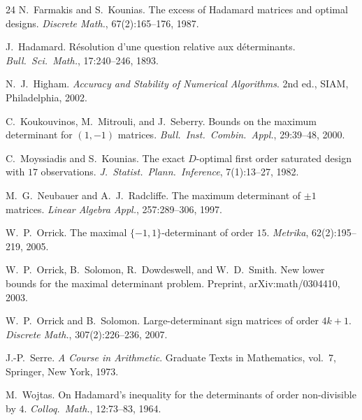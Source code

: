 \documentclass[11pt]{article}
\theoremstyle{remark}
\begin{document}
\begin{thebibliography}{24}
N.~Farmakis and S.~Kounias.
The excess of Hadamard matrices and optimal designs.
\emph{Discrete Math.}, 67(2):165--176, 1987.

J.~Hadamard.
R\'esolution d'une question relative aux d\'eterminants.
\emph{Bull.\ Sci.\ Math.}, 17:240--246, 1893.

N.~J.~Higham.
\emph{Accuracy and Stability of Numerical Algorithms}.
2nd ed., SIAM, Philadelphia, 2002.

C.~Koukouvinos, M.~Mitrouli, and J.~Seberry.
Bounds on the maximum determinant for $(1, -1)$ matrices.
\emph{Bull.\ Inst.\ Combin.\ Appl.}, 29:39--48, 2000.

C.~Moyssiadis and S.~Kounias.
The exact $D$-optimal first order saturated design with $17$ observations.
\emph{J.\ Statist.\ Plann.\ Inference}, 7(1):13--27, 1982.

M.~G.~Neubauer and A.~J.~Radcliffe.
The maximum determinant of $\pm 1$ matrices.
\emph{Linear Algebra Appl.}, 257:289--306, 1997.

W.~P.~Orrick.
The maximal $\{-1, 1\}$-determinant of order $15$.
\emph{Metrika}, 62(2):195--219, 2005.

W.~P.~Orrick, B.~Solomon, R.~Dowdeswell, and W.~D.~Smith.
New lower bounds for the maximal determinant problem.
Preprint, arXiv:math/0304410, 2003.

W.~P.~Orrick and B.~Solomon.
Large-determinant sign matrices of order $4k+1$.
\emph{Discrete Math.}, 307(2):226--236, 2007.

J.-P.~Serre.
\emph{A Course in Arithmetic}.
Graduate Texts in Mathematics, vol.~7, Springer, New York, 1973.

M.~Wojtas.
On Hadamard's inequality for the determinants of order non-divisible by $4$.
\emph{Colloq.\ Math.}, 12:73--83, 1964.

\end{thebibliography}
\end{document}
